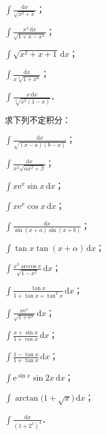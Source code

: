 \begin{xiti}
\begin{ziti}
\item $\displaystyle\int\frac{\mathrm{d}x}{\sqrt{x^{2}+x}}$；
\item $\displaystyle\int\frac{x^{2}\,\mathrm{d}x}{\sqrt{1+x-x^{2}}}$；
\item $\displaystyle\int\sqrt{x^{2}+x+1}\,\mathrm{d}x$；
\item $\displaystyle\int\frac{\mathrm{d}x}{x\sqrt[4]{1+x^{4}}}$；
\item $\displaystyle\int\frac{x\,\mathrm{d}x}{\sqrt[4]{x^{3}(1-x)}}$．
\end{ziti}
\item 求下列不定积分：
\begin{ziti}
\item $\displaystyle\int\frac{\mathrm{d}x}{\sqrt{(x-a)(b-x)}}$；
\item $\displaystyle\int\frac{\mathrm{d}x}{x^{2}\sqrt{\alpha x^{2}+\beta}}$；
\item $\displaystyle\int x\mathrm{e}^{x}\sin x\,\mathrm{d}x$；
\item $\displaystyle\int x\mathrm{e}^{x}\cos x\,\mathrm{d}x$；
\item $\displaystyle\int\frac{\mathrm{d}x}{\sin(x+a)\sin(x+b)}$；
\item $\displaystyle\int\tan x\tan(x+\alpha)\,\mathrm{d}x$；
\item $\displaystyle\int\frac{x^{3}\arccos x}{\sqrt{1-x^{2}}}\,\mathrm{d}x$；
\item $\displaystyle\int\frac{\tan x}{1+\tan x+\tan^{2}x}\,\mathrm{d}x$；
\item $\displaystyle\int\frac{x\mathrm{e}^{x}}{\sqrt{1+\mathrm{e}^{x}}}\,\mathrm{d}x$；
\item $\displaystyle\int\frac{x+\sin x}{1+\cos x}\,\mathrm{d}x$；
\item $\displaystyle\int\frac{1-\tan x}{1+\tan x}\,\mathrm{d}x$；
\item $\displaystyle\int\mathrm{e}^{\sin x}\sin 2x\,\mathrm{d}x$；
\item $\displaystyle\int\arctan\big(1+\sqrt{x}\big)\,\mathrm{d}x$；
\item $\displaystyle\int\frac{\mathrm{d}x}{\left(1+2^{x}\right)^{4}}$．
\end{ziti}
\end{xiti}
